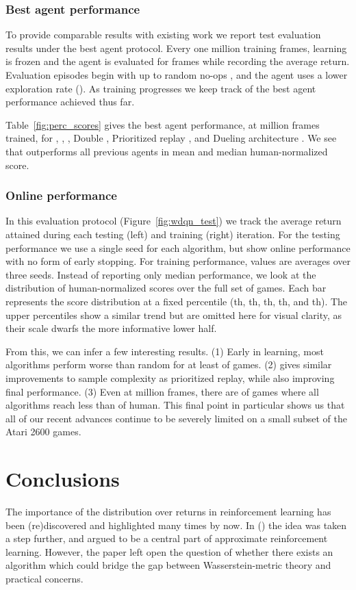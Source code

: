 \documentclass[letterpaper]{article}
\newcommand{\citet}[1]{\citeauthor{#1} (\citeyear{#1})}
\begin{document}
\subsubsection{Best agent performance}

To provide comparable results with existing work we report test evaluation results under the best agent protocol. Every one million training frames, learning is frozen and the agent is evaluated for  frames while recording the average return. Evaluation episodes begin with up to  random no-ops \cite{mnih15nature}, and the agent uses a lower exploration rate (). As training progresses we keep track of the best agent performance achieved thus far.

Table~\ref{fig:perc_scores} gives the best agent performance, at  million frames trained, for , , , Double  \cite{vanhasselt16deep}, Prioritized replay \cite{schaul16prioritized}, and Dueling architecture \cite{wang2016dueling}. We see that  outperforms all previous agents in mean and median human-normalized score. 

\subsubsection{Online performance}
In this evaluation protocol (Figure~\ref{fig:wdqn_test}) we track the average return attained during each testing (left) and training (right) iteration. For the testing performance we use a single seed for each algorithm, but show online performance with no form of early stopping. For training performance, values are averages over three seeds. Instead of reporting only median performance, we look at the distribution of human-normalized scores over the full set of games. Each bar represents the score distribution at a fixed percentile (th, th, th, th, and th). The upper percentiles show a similar trend but are omitted here for visual clarity, as their scale dwarfs the more informative lower half.

From this, we can infer a few interesting results. (1) Early in learning, most algorithms perform worse than random for at least  of games. (2)  gives similar improvements to sample complexity as prioritized replay, while also improving final performance. (3) Even at  million frames, there are  of games where all algorithms reach less than  of human. This final point in particular shows us that all of our recent advances continue to be severely limited on a small subset of the Atari 2600 games.

\section{Conclusions}
The importance of the distribution over returns in reinforcement learning has been (re)discovered and highlighted many times by now. In \citet{c51} the idea was taken a step further, and argued to be a central part of approximate reinforcement learning. However, the paper left open the question of whether there exists an algorithm which could bridge the gap between Wasserstein-metric theory and practical concerns.
\end{document}
